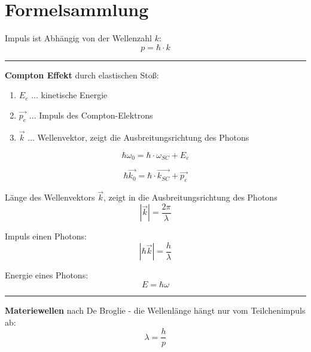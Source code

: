 \documentclass{article}
\begin{document}
\newpage
\section{Formelsammlung}

Impuls ist Abhängig von der Wellenzahl $k$:
\begin{equation}
    p = \hbar \cdot k
\end{equation}

\hrule
\vspace{0.5cm}
\textbf{Compton Effekt} durch elastischen Stoß:

\begin{enumerate}
    \item $E_e$ ... kinetische Energie
    \item $\vec{p_e}$ ... Impuls des Compton-Elektrons
    \item $\vec{k}$ ... Wellenvektor, zeigt die Ausbreitungsrichtung des Photons
\end{enumerate}

\begin{equation}
    \hbar \omega_0 = \hbar \cdot \omega_{SC} + E_e
\end{equation}

\begin{equation}
    \hbar \vec{k_0} = \hbar \cdot \vec{k_{SC}} + \vec{p_e}
\end{equation}

Länge des Wellenvektors $\vec{k}$, zeigt in die Ausbreitungsrichtung des Photons
\begin{equation}
    |\vec{k}| = \frac{2\pi}{\lambda}
\end{equation}

Impuls einen Photons:
\begin{equation}
    |\hbar \vec{k}| = \frac{h}{\lambda}
\end{equation}

Energie eines Photons:
\begin{equation}
   E = \hbar \omega 
\end{equation}

\hrule
\vspace{0.5cm}

\textbf{Materiewellen} nach De Broglie - die Wellenlänge hängt nur vom Teilchenimpuls ab:
\begin{equation}
    \lambda = \frac{h}{p}
\end{equation}
\end{document}
